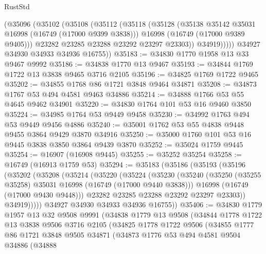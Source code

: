 \begin{lexlean}{RustStd}
\begin{coremodule}
            (@35096
              (@35102
                (@35108
                  (@35112
                    (@35118
                      (@35128
                        (@35138 @35142 @35031 @16998 (@16749 (@17000 @9399 @3838)))
                        @16998
                        (@16749 (@17000 @9389 @9405)))
                      @23282
                      @23285
                      @23288
                      @23292
                      @23297
                      @23303))
                  @34919)))))
        @34927
        @34930
        @34933
        @34936
        @16755))
@35183 := @34830 @1770 @1958 @13 @33 @9467 @9992
@35186 := @34838 @1770 @13 @9467
@35193 := @34844 @1769 @1722 @13 @3838 @9465 @3716 @2105
@35196 := @34825 @1769 @1722 @9465
@35202 := @34855 @1768 @86 @1721 @3848 @9464 @34871
@35208 := @34873 @1767 @53 @494 @4581 @9463 @34886
@35214 := @34888 @1766 @53 @55 @4645 @9462 @34901
@35220 := @34830 @1764 @101 @53 @16 @9460 @3850
@35224 := @34985 @1764 @53 @9449 @9458
@35230 := @34992 @1763 @494 @53 @9449 @9456 @4886
@35240 := @35001 @1762 @53 @55 @4838 @9448 @9455 @3864 @9429 @3870 @34916
@35250 := @35000 @1760 @101 @53 @16 @9445 @3838 @3850 @3864 @9439 @3870
@35252 := @35024 @1759 @9445
@35254 := @16907 (@16908 @9445)
@35255 := @35252 @35254
@35258 := @16749 (@16913 @1759 @53)
@35294 := @35183
    (@35186
      (@35193
        (@35196
          (@35202
            (@35208
              (@35214
                (@35220
                  (@35224
                    (@35230
                      (@35240
                        (@35250 (@35255 @35258) @35031 @16998 (@16749 (@17000 @9440 @3838)))
                        @16998
                        (@16749 (@17000 @9430 @9448)))
                      @23282
                      @23285
                      @23288
                      @23292
                      @23297
                      @23303))
                  @34919)))))
        @34927
        @34930
        @34933
        @34936
        @16755))
@35406 := @34830
    @1779
    @1957
    @13
    @32
    @9508
    @9991
    (@34838
      @1779
      @13
      @9508
      (@34844
        @1778
        @1722
        @13
        @3838
        @9506
        @3716
        @2105
        (@34825
          @1778
          @1722
          @9506
          (@34855
            @1777
            @86
            @1721
            @3848
            @9505
            @34871
            (@34873
              @1776
              @53
              @494
              @4581
              @9504
              @34886
              (@34888

\end{coremodule}
\end{lexlean}
